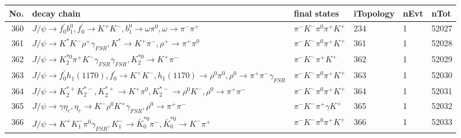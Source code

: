 \begin{table}[htbp] 
\begin{center}
\begin{small}
\begin{tabular}{rlllll}\hline\hline
 No. & decay chain & final states &  iTopology & nEvt & nTot \\\hline
360&$J/\psi       \rightarrow f^{'}_{0}     b_{1}^{0}      , f^{'}_{0}      \rightarrow K^{+}          K^{-}          , b_{1}^{0}       \rightarrow \omega         \pi^{0}        , \omega          \rightarrow \pi^{-}        \pi^{+}        $&$\pi^{-}        K^{-}          \pi^{0}        \pi^{+}        K^{+}          $&  234&    1&52027\\
361&$J/\psi       \rightarrow K^{*}          K^{-}          \rho^{+}      \gamma_{FSR} , K^{*}           \rightarrow K^{+}          \pi^{-}        , \rho^{+}       \rightarrow \pi^{+}        \pi^{0}        $&$\pi^{-}        K^{-}          \pi^{0}        \pi^{+}        K^{+}          $&  361&    1&52028\\
362&$J/\psi       \rightarrow K_2^{*0}       \pi^{+}        K^{-}          \gamma_{FSR} \gamma_{FSR} , K_2^{*0}        \rightarrow K^{+}          \pi^{-}        $&$\pi^{-}        K^{-}          \pi^{+}        K^{+}          $&  362&    1&52029\\
363&$J/\psi       \rightarrow f^{'}_{0}     h_{1}(1170)    , f^{'}_{0}      \rightarrow K^{+}          K^{-}          , h_{1}(1170)     \rightarrow \rho^{0}      \pi^{0}        , \rho^{0}       \rightarrow \pi^{+}        \pi^{-}        \gamma_{FSR} $&$\pi^{-}        K^{-}          \pi^{0}        \pi^{+}        K^{+}          $&  363&    1&52030\\
364&$J/\psi       \rightarrow K_2^{*+}       K_2^{*-}       , K_2^{*+}        \rightarrow K^{+}          \pi^{0}        , K_2^{*-}        \rightarrow \rho^{0}      K^{-}          , \rho^{0}       \rightarrow \pi^{+}        \pi^{-}        $&$\pi^{-}        K^{-}          \pi^{0}        \pi^{+}        K^{+}          $&  364&    1&52031\\
365&$J/\psi       \rightarrow \gamma       \eta_{c}    , \eta_{c}     \rightarrow K^{-}          \rho^{0}      K^{+}          \gamma_{FSR} , \rho^{0}       \rightarrow \pi^{+}        \pi^{-}        $&$\pi^{-}        K^{-}          \pi^{+}        \gamma       K^{+}          $&  365&    1&52032\\
366&$J/\psi       \rightarrow K^{+}          K_{1}^{-}      \pi^{0}        \gamma_{FSR} , K_{1}^{-}       \rightarrow \bar{K}_0^{*0}\pi^{-}        , \bar{K}_0^{*0} \rightarrow K^{-}          \pi^{+}        $&$\pi^{-}        K^{-}          \pi^{0}        \pi^{+}        K^{+}          $&  366&    1&52033\\

\end{tabular}
\end{small}
\end{center}
\end{table}
